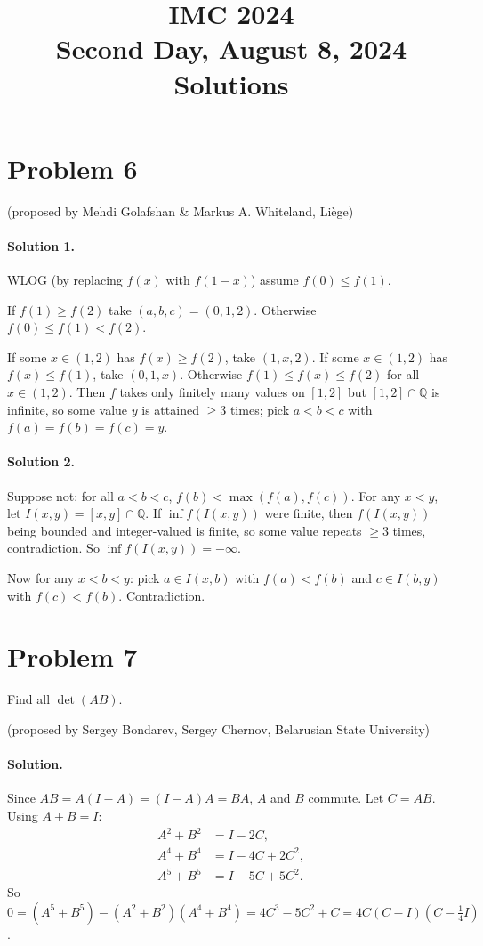 \documentclass{article}
\title{IMC 2024 \\ Second Day, August 8, 2024 \\ Solutions}
\date{}
\begin{document}
\maketitle

\section*{Problem 6}
(proposed by Mehdi Golafshan \& Markus A. Whiteland, Li\`ege)

\paragraph{Solution 1.}
WLOG (by replacing $f(x)$ with $f(1-x)$) assume $f(0) \leq f(1)$.

If $f(1) \geq f(2)$ take $(a,b,c) = (0,1,2)$. Otherwise $f(0) \leq f(1) < f(2)$.

If some $x \in (1,2)$ has $f(x) \geq f(2)$, take $(1, x, 2)$. If some $x \in (1,2)$ has $f(x) \leq f(1)$, take $(0, 1, x)$. Otherwise $f(1) \leq f(x) \leq f(2)$ for all $x \in (1,2)$. Then $f$ takes only finitely many values on $[1,2]$ but $[1,2] \cap \mathbb{Q}$ is infinite, so some value $y$ is attained $\geq 3$ times; pick $a < b < c$ with $f(a) = f(b) = f(c) = y$.

\paragraph{Solution 2.}
Suppose not: for all $a < b < c$, $f(b) < \max(f(a), f(c))$. For any $x < y$, let $I(x,y) = [x,y] \cap \mathbb{Q}$. If $\inf f(I(x,y))$ were finite, then $f(I(x,y))$ being bounded and integer-valued is finite, so some value repeats $\geq 3$ times, contradiction. So $\inf f(I(x,y)) = -\infty$.

Now for any $x < b < y$: pick $a \in I(x,b)$ with $f(a) < f(b)$ and $c \in I(b,y)$ with $f(c) < f(b)$. Contradiction.

\section*{Problem 7}
Find all $\det(AB)$.

(proposed by Sergey Bondarev, Sergey Chernov, Belarusian State University)

\paragraph{Solution.}
Since $AB = A(I-A) = (I-A)A = BA$, $A$ and $B$ commute. Let $C = AB$. Using $A + B = I$:
\begin{align*}
A^2+B^2 &= I - 2C, \\
A^4+B^4 &= I - 4C + 2C^2, \\
A^5+B^5 &= I - 5C + 5C^2.
\end{align*}
So $0 = (A^5+B^5) - (A^2+B^2)(A^4+B^4) = 4C^3 - 5C^2 + C = 4C(C-I)(C - \tfrac14 I)$.
\end{document}
